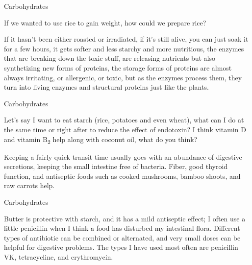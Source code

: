 \documentclass[11pt,oneside,openany,extrafontsizes]{memoir}
\begin{document}
\begin{qaexchange}{Carbohydrates}

    \begin{question}
        If we wanted to use rice to gain weight, how could we prepare rice?
    \end{question}

    \begin{answer}
        If it hasn't been either roasted or irradiated, if it's still alive, you can just soak it for a few hours, it gets softer and less starchy and more nutritious, the enzymes that are breaking down the toxic stuff, are releasing nutrients but also synthetizing new forms of proteins, the storage forms of proteins are almost always irritating, or allergenic, or toxic, but as the enzymes process them, they turn into living enzymes and structural proteins just like the plants.
    \end{answer}
\end{qaexchange}

\begin{qaexchange}{Carbohydrates}

    \begin{question}
        Let's say I want to eat starch (rice, potatoes and even wheat), what can I do at the same time or right after to reduce the effect of endotoxin? I think vitamin D and vitamin B\textsubscript{2} help along with coconut oil, what do you think?
    \end{question}

    \begin{answer}
        Keeping a fairly quick transit time usually goes with an abundance of digestive secretions, keeping the small intestine free of bacteria. Fiber, good thyroid function, and antiseptic foods such as cooked mushrooms, bamboo shoots, and raw carrots help.
    \end{answer}
\end{qaexchange}

\begin{standalonequote}{Carbohydrates}

    \begin{answer}
        Butter is protective with starch, and it has a mild antiseptic effect; I often use a little penicillin when I think a food has disturbed my intestinal flora. Different types of antibiotic can be combined or alternated, and very small doses can be helpful for digestive problems. The types I have used most often are penicillin VK, tetracycline, and erythromycin.
    \end{answer}
\end{standalonequote}
\end{document}
